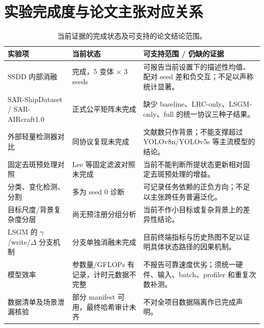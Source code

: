 \documentclass[UTF8,12pt,a4paper]{ctexart}
\begin{document}
\section{实验完成度与论文主张对应关系}
\begin{table}[H]\centering\scriptsize
\caption{当前证据的完成状态及可支持的论文结论范围。}
\begin{tabularx}{\linewidth}{p{3.3cm}p{2.3cm}X}
\toprule
实验项 & 当前状态 & 可支持范围 / 仍缺的证据\\
\midrule
SSDD 内部消融 & 完成，5 变体 $\times$ 3 seeds & 可报告当前设置下的描述性均值、配对 seed 差和负交互；不足以声称统计显著。\\
SAR-ShipDataset / SAR-AIRcraft1.0 & 正式公平矩阵未完成 & 缺少 baseline、LRC-only、LSGM-only、full 的统一协议三种子结果。\\
外部轻量检测器对比 & 同协议复现未完成 & 文献数只作背景；不能支撑超过 YOLOv8n/YOLOv5s 等主流模型的结论。\\
固定去斑预处理对照 & Lee 等固定滤波对照未完成 & 当前不能判断所提状态更新相对固定去斑预处理的增益。\\
分类、变化检测、分割 & 多为 seed 0 诊断 & 可记录任务依赖的正负方向；不足以主张跨任务普遍泛化。\\
目标尺度/背景复杂度分层 & 尚无预注册分组分析 & 当前不作小目标或复杂背景上的差异性结论。\\
LSGM 的 $\gamma$/write/$\Delta$ 分支机制 & 分支单独消融未完成 & 目前终端指标与历史热图不足以证明具体状态路径的因果机制。\\
模型效率 & 参数量/GFLOPs 有记录，计时元数据不完整 & 不报告可靠速度优劣；须统一硬件、输入、batch、profiler 和重复次数补测。\\
数据清单及场景泄漏核验 & 部分 manifest 可用，最终哈希审计未齐 & 不对全项目数据隔离作已完成声明。\\
\bottomrule
\end{tabularx}
\end{table}
\end{document}
